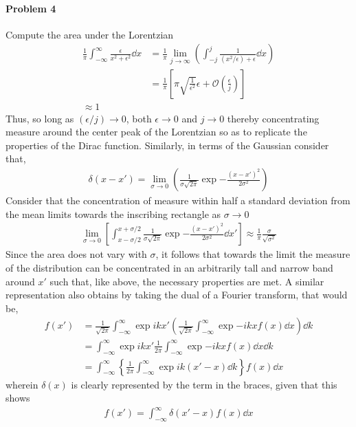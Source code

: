 \documentclass[12pt]{scrartcl}
\begin{document}
\paragraph{Problem 4}
Compute the area under the Lorentzian 
\begin{align}
\frac{1}{\pi}\int_{-\infty}^{\infty}\frac{\epsilon}{x^2 + \epsilon^2}\dd{x} &=\frac{1}{\pi} \lim_{j\to\infty}\left(\int_{-j}^{j}\frac{1}{(x^2/\epsilon) + \epsilon}\dd{x}\right)\\
&=\frac{1}{\pi}\left[ \pi\sqrt{\frac{1}{\epsilon^2}}\epsilon + \mathcal{O}\left(\frac{\epsilon}{j}\right)\right]\\
\approx 1 
\end{align}
Thus, so long as $(\epsilon/j)\to 0$, both $\epsilon\to 0$ and $j\to 0$ thereby concentrating measure around the center peak of the Lorentzian so as to replicate the properties of the Dirac function. Similarly, in terms of the Gaussian consider that,
\begin{align}
	\delta(x-x') = \lim_{\sigma\to 0}\left(\frac{1}{\sigma\sqrt{2\pi}}\exp{-\frac{(x-x')^2}{2\sigma^2}}\right)
\end{align}
Consider that the concentration of measure within half a standard deviation from the mean limits towards the inscribing rectangle as $\sigma\to 0$
\begin{align}
		\lim_{\sigma\to 0}\left[\int_{x-\sigma/2}^{x+\sigma/2}\frac{1}{\sigma\sqrt{2\pi}}\exp{-\frac{(x-x')^2}{2\sigma^2}}\dd{x'}\right] \approx \frac{1}{\pi}\frac{\sigma}{\sqrt{\sigma^2}}
\end{align}
Since the area does not vary with $\sigma$, it follows that towards the limit the measure of the distribution can be concentrated in an arbitrarily tall and narrow band around $x'$ such that, like above, the necessary properties are met. A similar representation also obtains by taking the dual of a Fourier transform, that would be,
\begin{align}
	f(x') &= \frac{1}{\sqrt{2\pi}}\int_{-\infty}^{\infty}\exp{i k x'}\left(\frac{1}{\sqrt{2\pi}}\int_{-\infty}^{\infty}\exp{-i k x}f(x)\dd{x}\right)\dd{k}\\
	&= \int_{-\infty}^{\infty}\exp{i k x'}\frac{1}{2\pi}\int_{-\infty}^{\infty}\exp{-i k x}f(x)\dd{x}\dd{k}\\
	&= \int_{-\infty}^{\infty}\left\{\frac{1}{2\pi}\int_{-\infty}^{\infty}\exp{i k (x'-x)}\dd{k}\right\}f(x)\dd{x}
\end{align}
wherein $\delta(x)$ is clearly represented by the term in the braces, given that this shows
\begin{align}
f(x') = \int_{-\infty}^{\infty}\delta(x'-x)f(x)\dd{x}	
\end{align}
\end{document}
